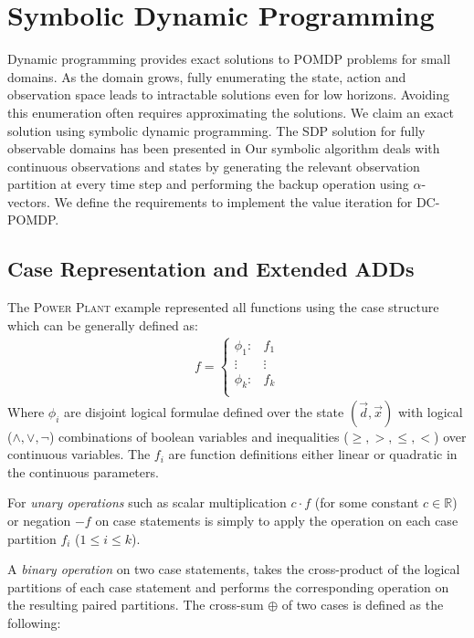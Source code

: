 \documentclass{article}
\begin{document}
\section{Symbolic Dynamic Programming} 
Dynamic programming provides exact solutions to POMDP problems for small domains. As the domain grows, fully enumerating the state, action and observation space leads to intractable solutions even for low horizons. Avoiding this enumeration often requires approximating the solutions. We claim an exact solution using symbolic dynamic programming. The SDP solution for fully observable domains has been presented in \cite{sanner_uai11} %
Our symbolic algorithm deals with continuous observations and states by generating the relevant observation partition at every time step and performing the backup operation using $\alpha$-vectors. We define the requirements to implement the value iteration for DC-POMDP. 

\subsection{Case Representation and Extended ADDs}
The \textsc{Power Plant} example represented all functions using the case structure which can be generally defined as:
{%
\begin{align}
f = 
\begin{cases}
  \phi_1: & f_1 \\ 
 \vdots&\vdots\\ 
  \phi_k: & f_k \\ 
\end{cases} \nonumber
\end{align}
}
Where $\phi_i$ are disjoint logical formulae defined over the state $(\vec{d},\vec{x})$ with logical ($\land,\lor,\neg$) combinations of boolean variables and inequalities ($\geq,>,\leq,<$) over continuous variables.  
The $f_i$ are function definitions either linear or quadratic in the continuous parameters. 

For \emph{unary operations} such as scalar multiplication $c\cdot f$ (for some constant $c \in \mathbb{R}$) or negation $-f$ on case statements is simply to apply the operation on each case partition $f_i$ ($1 \leq i \leq k$). 

A \emph{binary operation} on two case statements, takes the cross-product of the logical partitions of each case statement and performs the corresponding operation on the resulting paired partitions.  The cross-sum $\oplus$ of two cases is defined as the following:
\end{document}
